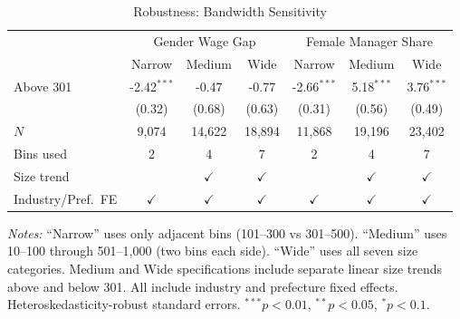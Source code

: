 \begin{table}[t]
\centering
\caption{Robustness: Bandwidth Sensitivity}
\label{tab:bandwidth}
\begin{tabular}{lcccccc}
\hline\hline
 & \multicolumn{3}{c}{Gender Wage Gap} & \multicolumn{3}{c}{Female Manager Share} \\
 & Narrow & Medium & Wide & Narrow & Medium & Wide \\
\hline
Above 301 & -2.42$^{***}$ & -0.47 & -0.77 & -2.66$^{***}$ & 5.18$^{***}$ & 3.76$^{***}$ \\
 & (0.32) & (0.68) & (0.63) & (0.31) & (0.56) & (0.49) \\
\hline
$N$ & 9,074 & 14,622 & 18,894 & 11,868 & 19,196 & 23,402 \\
Bins used & 2 & 4 & 7 & 2 & 4 & 7 \\
Size trend & & $\checkmark$ & $\checkmark$ & & $\checkmark$ & $\checkmark$ \\
Industry/Pref.\ FE & $\checkmark$ & $\checkmark$ & $\checkmark$ & $\checkmark$ & $\checkmark$ & $\checkmark$ \\
\hline\hline
\end{tabular}
\begin{tablenotes}\small
\item \textit{Notes:} ``Narrow'' uses only adjacent bins (101--300 vs 301--500). ``Medium'' uses 10--100 through 501--1,000 (two bins each side). ``Wide'' uses all seven size categories. Medium and Wide specifications include separate linear size trends above and below 301. All include industry and prefecture fixed effects. Heteroskedasticity-robust standard errors. $^{***}p<0.01$, $^{**}p<0.05$, $^{*}p<0.1$.
\end{tablenotes}
\end{table}

